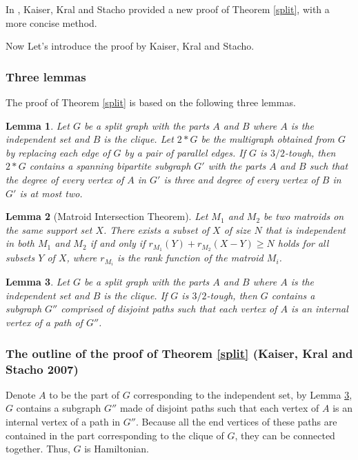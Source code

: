 \documentclass[12pt]{report}
\newtheorem{lemma}{Lemma}
\begin{document}
In \cite{kaiser2007tough}, Kaiser, Kral and Stacho provided a new proof of Theorem \ref{split}, with a more concise method.

Now Let's introduce the proof by Kaiser, Kral and Stacho.
\subsubsection{Three lemmas}
The proof of Theorem \ref{split} is based on the following three lemmas.
\begin{lemma}\label{s1}{\cite[Lemma 1.]{kaiser2007tough}}
Let $G$ be a split graph with the parts $A$ and $B$ where $A$ is the independent set and $B$ is the clique. Let $2*G$ be the multigraph obtained from $G$ by replacing each edge of $G$ by a pair of parallel edges. If $G$ is $3/2$-tough, then $2*G$ contains a spanning bipartite subgraph $G'$ with the parts $A$ and $B$ such that the degree of every vertex of $A$ in $G'$ is three and degree of every vertex of $B$ in $G'$ is at most two.

\end{lemma}


\begin{lemma}[Matroid Intersection Theorem]\label{matroid}
Let $M_1$ and $M_2$ be two matroids on the same support set $X$. There exists a subset of $X$ of size $N$ that is independent in both $M_1$ and $M_2$ if and only if $r_{M_1}(Y)+r_{M_2}(X-Y)\ge N$ holds for all subsets $Y$ of $X$, where $r_{M_i}$ is the rank function of the matroid $M_i$.
\end{lemma}

\begin{lemma}\label{s2}{\cite[Lemma 2.]{kaiser2007tough}}
Let $G$ be a split graph with the parts $A$ and $B$ where $A$ is the independent set and $B$ is the clique. If $G$ is $3/2$-tough, then $G$ contains a subgraph $G''$ comprised of disjoint paths such that each vertex of $A$ is an internal vertex of a path of $G''$.
\end{lemma}

\subsubsection{The outline of the proof of Theorem \ref{split} (Kaiser, Kral and Stacho 2007)}
Denote $A$ to be the part of $G$ corresponding to the independent set, by Lemma \ref{s2}, $G$ contains a subgraph $G''$ made of disjoint paths such that each vertex of $A$ is an internal vertex of a path in  $G''$. Because all the end vertices of these paths are contained in the part corresponding to the clique of $G$, they can be connected together. Thus, $G$ is Hamiltonian.
\end{document}
